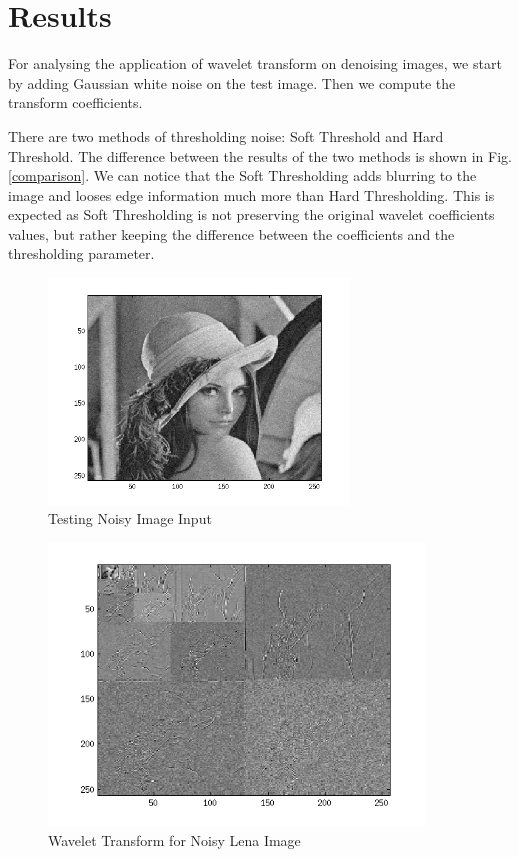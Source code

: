 \documentclass[a4paper,11pt]{article}
\begin{document}
\section*{Results}
For analysing the application of wavelet transform on denoising images, we start by adding Gaussian white noise on the test image. Then we compute the transform coefficients.

There are two methods of thresholding noise: Soft Threshold and Hard Threshold. The difference between the results of the two methods is shown in Fig.\ref{comparison}. We can notice that the Soft Thresholding adds blurring to the image and looses edge information much more than Hard Thresholding. This is expected as Soft Thresholding is not preserving the original wavelet coefficients values, but rather keeping the difference between the coefficients and the thresholding parameter.
\begin{figure}[ht!]
  \centering
  \includegraphics[width=80mm]{noisylena.png}
  \caption{Testing Noisy Image Input}
  \label{noisy}
\end{figure}

\begin{figure}[ht!]
  \centering
  \includegraphics[width=100mm]{transform.png}
  \caption{Wavelet Transform for Noisy Lena Image}
  \label{transform}
\end{figure}
\end{document}
